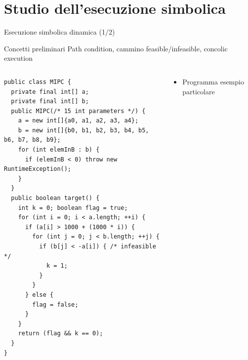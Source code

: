 \documentclass{beamer}
\begin{document}
\section{Studio dell'esecuzione simbolica}
\begin{frame}[fragile]{Esecuzione simbolica dinamica (1/2)}
    \begin{block}{Concetti preliminari}
            Path condition, cammino feasible/infeasible, concolic execution
    \end{block}
    \begin{columns}[T]
        \begin{column}{0.77\textwidth}
            \vspace{-3mm}
            \hspace{1.5mm}
            \begin{minipage}{\dimexpr\textwidth-3mm}
                \begin{lstlisting}
public class MIPC {
  private final int[] a;
  private final int[] b;
  public MIPC(/* 15 int parameters */) {
    a = new int[]{a0, a1, a2, a3, a4};
    b = new int[]{b0, b1, b2, b3, b4, b5, b6, b7, b8, b9};
    for (int elemInB : b) {
      if (elemInB < 0) throw new RuntimeException();
    }
  }
  public boolean target() {
    int k = 0; boolean flag = true;
    for (int i = 0; i < a.length; ++i) {
      if (a[i] > 1000 + (1000 * i)) {
        for (int j = 0; j < b.length; ++j) {
          if (b[j] < -a[i]) { /* infeasible */
            k = 1;
          }
        }
      } else {
        flag = false;
      }
    }
    return (flag && k == 0);
  }
}
                \end{lstlisting}
            \end{minipage}
        \end{column}
        \begin{column}{0.22\textwidth}
        \vspace{5mm}
            \begingroup
            \setlength{\leftmargini}{-2mm}
            \begin{itemize}
                \setlength\itemsep{2em}
                \item Programma esempio particolare
            \end{itemize}
            \endgroup
        \end{column}
    \end{columns}
\end{frame}

\end{document}
